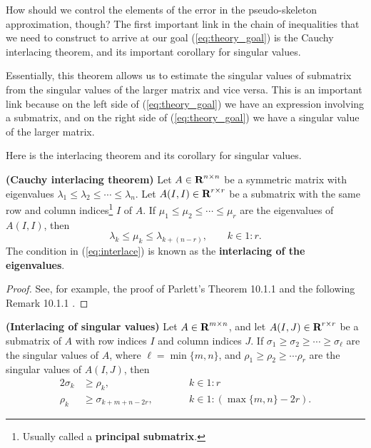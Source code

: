 \documentclass{article}
\begin{document}
	How should we control the elements of the error in the pseudo-skeleton approximation, though? The first important link in the chain of inequalities that we need to construct to arrive at our goal (\ref{eq:theory_goal}) is the Cauchy interlacing theorem, and its important corollary for singular values. 
	
	Essentially, this theorem allows us to estimate the singular values of submatrix from the singular values of the larger matrix and vice versa. This is an important link because on the left side of (\ref{eq:theory_goal}) we have an expression involving a submatrix, and on the right side of (\ref{eq:theory_goal}) we have a singular value of the larger matrix.
	
	Here is the interlacing theorem and its corollary for singular values.
	
	\begin{lem} \textnormal{\bf(Cauchy interlacing theorem)}
		\label{lem:cauchy_interlace}
		Let $A \in \textnormal{\bf R}^{n\times n}$ be a symmetric matrix with eigenvalues $\lambda_1 \le \lambda_2 \le \cdots \le \lambda_n$. Let $A(I,I) \in \textnormal{\bf R}^{r\times r}$ be a submatrix with the same row and column indices\footnote{Usually called a \textbf{principal submatrix}.} $I$ of $A$. If $\mu_1 \le \mu_2 \le\cdots\le\mu_r$ are the eigenvalues of $A(I,I)$, then
		\begin{equation}
			\label{eq:interlace}
			\lambda_k \le \mu_k \le \lambda_{k + (n-r)}, \qquad k\in 1:r.
		\end{equation}
		The condition in (\ref{eq:interlace}) is known as the \textbf{interlacing of the eigenvalues}.
	\end{lem}
	
	\begin{proof}
		See, for example, the proof of Parlett's Theorem 10.1.1 and the following Remark 10.1.1 \cite{parlett_1998}.
	\end{proof}
	
	\begin{lem} \textnormal{\bf(Interlacing of singular values)}
		\label{lem:singular_interlace}
		Let $A \in \textnormal{\bf R}^{m\times n}$, and let $A(I,J) \in \textnormal{\bf R}^{r\times r}$ be a submatrix of $A$ with row indices $I$ and column indices $J$. If $\sigma_1 \ge \sigma_2 \ge \cdots\ge \sigma_{\ell}$ are the singular values of $A$, where $\ell = \min\{m,n\}$, and $\rho_1 \ge \rho_2 \ge\cdots \rho_r$ are the singular values of $A(I,J)$, then
		\begin{alignat}{2}
			\sigma_k &\ge \rho_k,& &\qquad k \in 1:r \\
			\rho_k &\ge \sigma_{k + m+n -2r},&&\qquad k \in 1:(\max\{m,n\} - 2r).
		\end{alignat}
	\end{lem}
	
\end{document}
